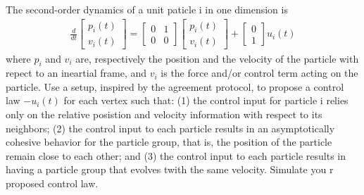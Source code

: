 \documentclass{article}
\begin{document}
\begin{problem}
    The second-order dynamics of a unit paticle i in one dimension is 
    \begin{align*}
        \frac{d}{dt} 
        \begin{bmatrix*}
            p_i(t)\\
            v_i(t)  
        \end{bmatrix*}
        = \begin{bmatrix*}
            0 & 1\\
            0 & 0 
        \end{bmatrix*}
        \begin{bmatrix*}
            p_i(t)\\
            v_i(t)  
        \end{bmatrix*}
        + 
        \begin{bmatrix*}
            0\\
            1
        \end{bmatrix*} u_i(t)
    \end{align*}
    where $p_i$ and $v_i$ are, respectively the position and the velocity of the particle with repect to an ineartial frame, and $v_i$ is the force and/or control term acting on the particle. Use a setup, inspired by the agreement protocol, to propose a control law $-u_i(t)$ for each vertex such that: (1) the control input for particle i relies only on the relative posistion and velocity information with respect to its neighbors; (2) the control input to each particle results in an asymptotically cohesive behavior for the particle group, that is, the position of the particle remain close to each other; and (3) the control input to each particle results in having a particle group that evolves twith the same velocity. Simulate you r proposed control law.


\end{problem}
\end{document}
